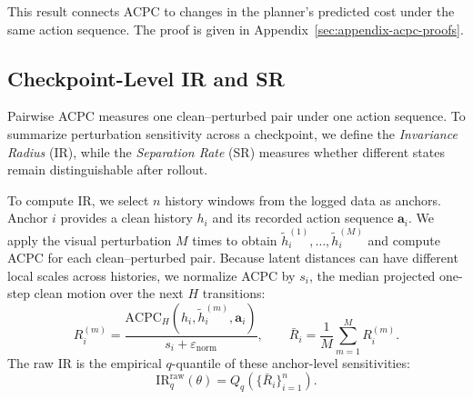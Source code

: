 This result connects ACPC to changes in the planner's predicted cost under
the same action sequence. The proof is given in
Appendix~\ref{sec:appendix-acpc-proofs}.

\subsection{Checkpoint-Level IR and SR}
\label{sec:acpc-ir-sr}

Pairwise ACPC measures one clean--perturbed pair under one action sequence.
To summarize perturbation sensitivity across a checkpoint, we define the
\emph{Invariance Radius} (IR), while the \emph{Separation Rate} (SR) measures
whether different states remain distinguishable after rollout.

To compute IR, we select $n$ history windows from the logged data as anchors.
Anchor $i$ provides a clean history $h_i$ and its recorded action sequence
$\mathbf a_i$. We apply the visual perturbation $M$ times to obtain
$\tilde h_i^{(1)},\ldots,\tilde h_i^{(M)}$ and compute ACPC for each
clean--perturbed pair. Because latent distances can have different local
scales across histories, we normalize ACPC by $s_i$, the median projected
one-step clean motion over the next $H$ transitions:
\begin{equation}
R_i^{(m)}
=
\frac{
\mathrm{ACPC}_H(h_i,\tilde h_i^{(m)},\mathbf a_i)
}{
s_i+\varepsilon_{\mathrm{norm}}
},
\qquad
\bar R_i=\frac{1}{M}\sum_{m=1}^{M}R_i^{(m)}.
\label{eq:normalized-same-state-radius}
\end{equation}
The raw IR is the empirical $q$-quantile of these anchor-level sensitivities:
\begin{equation}
\mathrm{IR}^{\mathrm{raw}}_q(\theta)
=
Q_q\!\left(\{\bar R_i\}_{i=1}^{n}\right).
\label{eq:ir-raw}
\end{equation}

